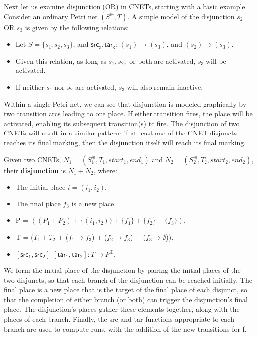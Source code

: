 \begin{example}
  \label{ex:OR-PN}
Next let us examine disjunction (OR) in CNETs, starting with a basic example. Consider an ordinary Petri net $(S^\oplus, T)$. A simple model of the disjunction $s_2$ OR $s_3$ is given by the following relations:
  \begin{itemize}
  \item Let $S = \{s_1, s_2, s_3\}$, and $\mathsf{src_x}, \mathsf{tar_x}$: $(s_1) \to (s_3)$, and $(s_2) \to (s_3)$. 
  \item Given this relation, as long as $s_1, s_2,$ or both are activated, $s_3$ will be activated. 
  \item If neither $s_1$ nor $s_2$ are activated, $s_3$ will also remain inactive.  
  \end{itemize}
Within a single Petri net, we can see that disjunction is modeled graphically by two transition arcs leading to one place. If either transition fires, the place will be activated, enabling its subsequent transition(s) to fire. The disjunction of two CNETs will result in a similar pattern: if at least one of the CNET disjuncts reaches its final marking, then the disjunction itself will reach its final marking.   
\end{example}

\begin{definition}
  \label{def:OR-PN}
  Given two CNETs, $N_1= (S_1^\oplus, T_1, start_1, end_1)$ and $N_2= (S_2^\oplus, T_2, start_2, end_2)$, their \textbf{disjunction} is $N_1 + N_2$, where:  
  \begin{itemize}
  \item The initial place $i = (i_1 , i_2)$.
  \item The final place $f_3$ is a new place.
  \item P = $((P_1 + P_2) + \{(i_1 , i_2)\} + \{f_1\} + \{f_2\} + \{f_3\}).$ 
  \item T = ($T_1 + T_2$ + ($f_1 \to f_3$) + ($f_2 \to f_3$) + ($f_3 \to \emptyset$)).
  \item $[\mathsf{src_1}, \mathsf{src_2}], [\mathsf{tar_1}, \mathsf{tar_2}]: T\to P^\oplus$. 
  \end{itemize}  
  We form the initial place of the disjunction by pairing the initial
  places of the two disjuncts, so that each branch of the disjunction
  can be reached initially. The final place is a new place that is the
  target of the final place of each disjunct, so that the completion of
  either branch (or both) can trigger the disjunction's final place. The
  disjunction's places gather these elements together, along with the
  places of each branch. Finally, the src and tar functions appropriate
  to each branch are used to compute runs, with the addition of the new
  transitions for f.
\end{definition}

